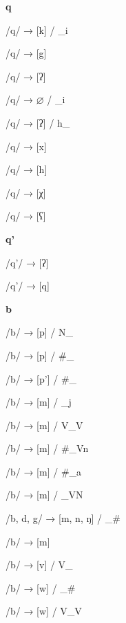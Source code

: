 \begin{center}\textbf{q}\end{center}
\begin{multicols}{4}
\noindent /q/ → [k] / \_i

\noindent /q/ → [g]

\noindent /q/ → [ʔ]

\noindent /q/ → $\varnothing$ / \_i

\noindent /q/ → [ʔ] / h\_

\noindent /q/ → [x]

\noindent /q/ → [h]

\noindent /q/ → [χ]

\noindent /q/ → [ʕ]
\end{multicols}

\begin{center}\textbf{q'}\end{center}
\begin{multicols}{4}
\noindent /q'/ → [ʔ]

\noindent /q'/ → [q]
\end{multicols}

\begin{center}\textbf{b}\end{center}
\begin{multicols}{4}
\noindent /b/ → [p] / N\_

\noindent /b/ → [p] / \#\_

\noindent /b/ → [p'] / \#\_

\noindent /b/ → [m] / \_j

\noindent /b/ → [m] / V\_V

\noindent /b/ → [m] / \#\_Vn

\noindent /b/ → [m] / \#\_a

\noindent /b/ → [m] / \_VN

\noindent /b, d, g/ → [m, n, ŋ] / \_\#

\noindent /b/ → [m]

\noindent /b/ → [v] / V\_

\noindent /b/ → [w] / \_\#

\noindent /b/ → [w] / V\_V
\end{multicols}

